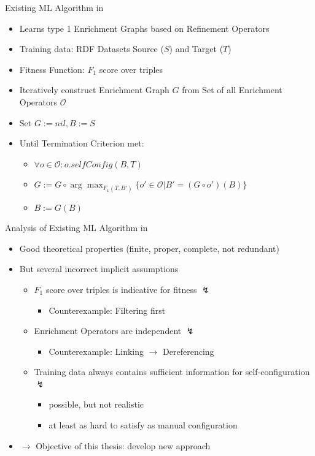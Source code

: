 \documentclass[aspectratio=1610]{beamer}
\def\<#1>{{\textsmaller{#1}}}
\begin{document}
\begin{frame}{Existing ML Algorithm in \<DEER>}
\begin{itemize}
  \item Learns type 1 Enrichment Graphs based on Refinement Operators
  \item Training data: RDF Datasets Source ($S$) and Target ($T$)
  \item Fitness Function: $F_1$ score over triples
  \item Iteratively construct Enrichment Graph $G$ from Set of all Enrichment Operators $\mathcal{O}$
  \item Set $G:=\textit{nil}, B:=S$
  \item Until Termination Criterion met:
  \begin{itemize}
    \item $\forall o\in\mathcal{O}: o\textit{.selfConfig}(B, T)$
    \item $G := G \circ \arg\max_{F_1(T, B')}\{o'\in\mathcal{O}|B'=(G \circ o')(B)\}$
    \item $B := G(B)$
  \end{itemize}
\end{itemize}
\end{frame}
\begin{frame}{Analysis of Existing ML Algorithm in \<DEER>}
\begin{itemize}
  \item Good theoretical properties \small{(finite, proper, complete, not redundant)}
  \item But several incorrect implicit assumptions
  \begin{itemize}
    \item $F_1$ score over triples is indicative for fitness $\lightning$
    \begin{itemize}
      \item Counterexample: Filtering first
    \end{itemize}
    \item Enrichment Operators are independent $\lightning$
    \begin{itemize}
      \item Counterexample: Linking $\to$ Dereferencing 
    \end{itemize}
    \item Training data always contains sufficient information for self-configuration $\lightning$
    \begin{itemize}
      \item possible, but not realistic
      \item at least as hard to satisfy as manual configuration
    \end{itemize}
  \end{itemize}
  \item $\to$ Objective of this thesis: develop new approach
\end{itemize}
\end{frame}
\end{document}
